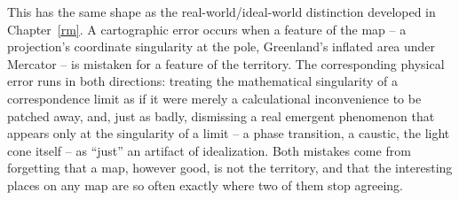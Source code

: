 This has the same shape as the real-world/ideal-world distinction developed in
Chapter~\ref{rm}. A cartographic error occurs when a feature of the map -- a
projection's coordinate singularity at the pole, Greenland's inflated area
under Mercator -- is mistaken for a feature of the territory. The corresponding
physical error runs in both directions: treating the mathematical singularity
of a correspondence limit as if it were merely a calculational inconvenience to
be patched away, and, just as badly, dismissing a real emergent phenomenon that
appears only at the singularity of a limit -- a phase transition, a caustic,
the light cone itself -- as ``just'' an artifact of idealization. Both mistakes
come from forgetting that a map, however good, is not the territory, and that
the interesting places on any map are so often exactly where two of them stop
agreeing.


